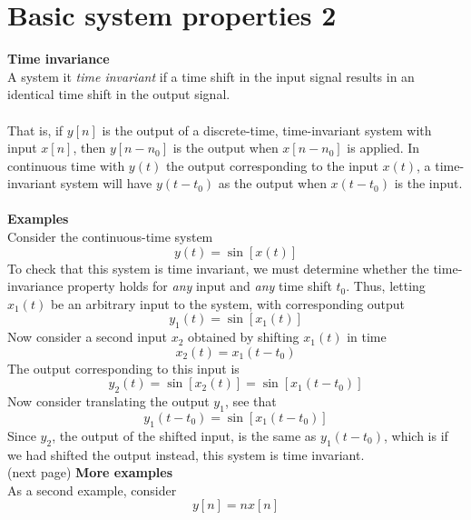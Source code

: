 \documentclass{report}
\begin{document}
\section{Basic system properties 2}
\textbf{Time invariance}\\
A system it \textit{time invariant} if a time shift in the input signal results in an identical time shift in the output
signal.\\
\vspace{1mm}\\
That is, if $y[n]$ is the output of a discrete-time, time-invariant system with input $x[n]$, then $y[n-n_0]$ is the output
when $x[n-n_0]$ is applied. In continuous time with $y(t)$ the output corresponding to the input $x(t)$, a time-invariant system
will have $y(t-t_0)$ as the output when $x(t-t_0)$ is the input.\\
\vspace{1mm}\\
\textbf{Examples}\\
Consider the continuous-time system
\begin{equation*}
y(t)=\sin[x(t)]
\end{equation*}
To check that this system is time invariant, we must determine whether the time-invariance property holds for \textit{any} input
and \textit{any} time shift $t_0$. Thus, letting $x_1(t)$ be an
arbitrary input to the system, with corresponding output
\begin{equation*}
y_1(t)=\sin[x_1(t)]
\end{equation*}
Now consider a second input $x_2$ obtained by shifting $x_1(t)$ in time
\begin{equation*}
x_2(t)=x_1(t-t_0)
\end{equation*}
The output corresponding to this input is
\begin{equation*}
y_2(t)=\sin[x_2(t)]=\sin[x_1(t-t_0)]
\end{equation*}
Now consider translating the output $y_1$, see that
\begin{equation*}
y_1(t-t_0)=\sin[x_1(t-t_0)]
\end{equation*}
Since $y_2$, the output of the shifted input, is the same as $y_1(t-t_0)$, which is if we had shifted the output instead, this
system is time invariant.\\
(next page)\newpage
\noindent\textbf{More examples}\\
As a second example, consider
\begin{equation*}
y[n]=nx[n]
\end{equation*}
\end{document}

